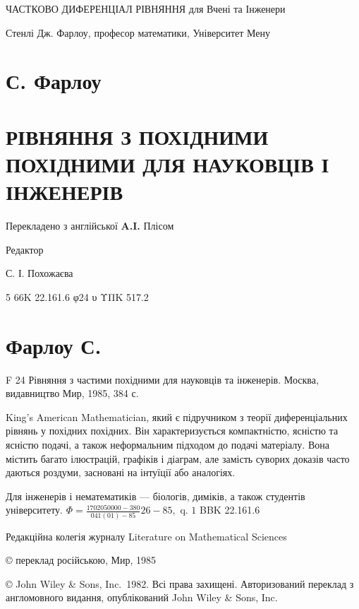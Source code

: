 \documentclass[
]{article}
\author{}
\date{}
\begin{document}
ЧАСТКОВО ДИФЕРЕНЦІАЛ РІВНЯННЯ для Вчені та Інженери

Стенлі Дж. Фарлоу, професор математики, Університет Мену

\section{С. Фарлоу}\label{ux441.-ux444ux430ux440ux43bux43eux443}

\section{РІВНЯННЯ З ПОХІДНИМИ ПОХІДНИМИ ДЛЯ НАУКОВЦІВ І
ІНЖЕНЕРІВ}\label{ux440ux456ux432ux43dux44fux43dux43dux44f-ux437-ux43fux43eux445ux456ux434ux43dux438ux43cux438-ux43fux43eux445ux456ux434ux43dux438ux43cux438-ux434ux43bux44f-ux43dux430ux443ux43aux43eux432ux446ux456ux432-ux456-ux456ux43dux436ux435ux43dux435ux440ux456ux432}

Перекладено з англійської \textbf{A.I.} Плісом

Редактор

С. І. Похожаєва

5\textbar{} 66K 22.161.6 φ24 υ ΥΠΚ 517.2

\section{Фарлоу С.}\label{ux444ux430ux440ux43bux43eux443-ux441.}

F 24 Рівняння з частими похідними для науковців та інженерів. Москва,
видавництво Мир, 1985, 384 с.

King's American Mathematician, який є підручником з теорії
диференціальних рівнянь у похідних похідних. Він характеризується
компактністю, ясністю та ясністю подачі, а також неформальним підходом
до подачі матеріалу. Вона містить багато ілюстрацій, графіків і діаграм,
але замість суворих доказів часто даються роздуми, засновані на інтуїції
або аналогіях.

Для інженерів і нематематиків --- біологів, диміків, а також студентів
університету.
\(\Phi = \frac{1702050000-380}{041(01)-85} 26-85, \text{ q. 1}\) BBK
22.161.6

Редакційна колегія журналу Literature on Mathematical Sciences

© переклад російською, Мир, 1985

© John Wiley \& Sons, Inc.~1982. Всі права захищені. Авторизований
переклад з англомовного видання, опублікований John Wiley \& Sons, Inc.
\end{document}
